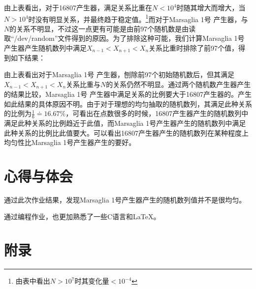 \documentclass[a4paper,11pt]{article}
\begin{document}
  由上表看出，对于16807产生器，满足关系比重在$N<10^{4}$时随其增大而增大，当$N>10^{4}$时没有明显关系，并最终趋于稳定值。\footnote{由表中看出$N>10^{7}$时其变化量$<10^{-4}$}而对于Marsaglia 1号 产生器，与$N$的关系不明显，不过这一点更有可能是由前97个随机数是由读取“/dev/random”文件得到的原因。为了排除这种可能，我们计算Marsaglia 1号 产生器产生随机数列中满足$X_{n-1} < X_{n+1} < X_{n}$关系比重时排除了前97个值，得到如下结果：
\begin{table}[!htb]
\centering
{}
\caption{Marsaglia 1号 产生器刨除前97个随机数后满足$X_{n-1} < X_{n+1} < X_{n}$关系比重一览表}
\end{table}

由上表看出对于Marsaglia 1号 产生器，刨除前97个初始随机数后，但其满足$X_{n-1} < X_{n+1} < X_{n}$关系比重与$N$的关系仍然不明显。通过两个随机数产生器产生的结果比较，Marsaglia 1号 产生器中满足关系的比例要大于16807产生器的。产生如此结果的具体原因不明。由于对于理想的均匀抽取的随机数列，其满足此种关系的比例为$\frac{1}{6}\doteq16.67\%$，可看出在点数很多的时候，16807产生器产生的随机数列中满足此种关系的比例趋近于此值，而Marsaglia 1号产生器产生的随机数列中满足此种关系的比例比此值要大。可以看出16807产生器产生的随机数列在某种程度上均匀性比Marsaglia 1号产生器产生的要好。



\section{心得与体会}
通过此次作业结果，发现Marsaglia 1号产生器产生的随机数列值并不是很均匀。

通过编程作业，也更加熟悉了一些C语言和\LaTeX 。

\newpage
\section{附录}
\end{document}
